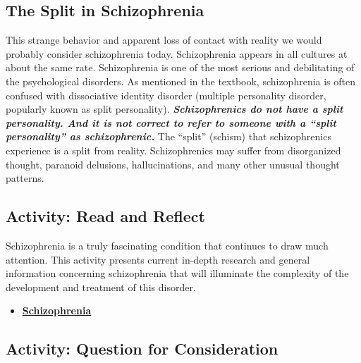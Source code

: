 \documentclass[
]{book}
\providecommand{\tightlist}{%
  \setlength{\itemsep}{0pt}\setlength{\parskip}{0pt}}
\begin{document}
\hypertarget{the-split-in-schizophrenia}{%
\subsection*{The Split in Schizophrenia}\label{the-split-in-schizophrenia}}

This strange behavior and apparent loss of contact with reality we would probably consider schizophrenia today. Schizophrenia appears in all cultures at about the same rate. Schizophrenia is one of the most serious and debilitating of the psychological disorders. As mentioned in the textbook, schizophrenia is often confused with dissociative identity disorder (multiple personality disorder, popularly known as split personality). \textbf{\emph{Schizophrenics do not have a split personality. And it is not correct to refer to someone with a ``split personality'' as schizophrenic.}} The ``split'' (schism) that schizophrenics experience is a split from reality. Schizophrenics may suffer from disorganized thought, paranoid delusions, hallucinations, and many other unusual thought patterns.

\hypertarget{activity-read-and-reflect-18}{%
\subsection*{Activity: Read and Reflect}\label{activity-read-and-reflect-18}}

\begin{reflect}
Schizophrenia is a truly fascinating condition that continues to draw much attention. This activity presents current in-depth research and general information concerning schizophrenia that will illuminate the complexity of the development and treatment of this disorder.

\begin{itemize}
\tightlist
\item
  \href{http://schizophrenia.com/}{\textbf{Schizophrenia}}
\end{itemize}
\end{reflect}

\hypertarget{activity-question-for-consideration-7}{%
\subsection*{Activity: Question for Consideration}\label{activity-question-for-consideration-7}}
\end{document}
